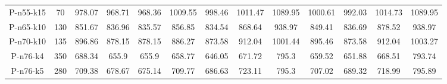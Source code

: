 \documentclass[11pt]{article} %
\begin{document}
\begin{enumerate}
\begin{landscape}
\begin{table}[p]
\begin{small}
\begin{tabular}{ccccccccccccc}
P-n55-k15&70&978.07&968.71&968.36&1009.55&998.46&1011.47&1089.95&1000.61&992.03&1014.73&1089.95\\
P-n65-k10&130&851.67&836.96&835.57&856.85&834.54&868.64&938.97&849.41&836.69&878.52&938.97\\
P-n70-k10&135&896.86&878.15&878.15&886.27&873.58&912.04&1001.44&895.46&873.58&912.04&1003.27\\
P-n76-k4&350&688.34&655.9&655.9&658.77&646.05&671.72&795.3&659.52&651.88&668.51&793.74\\
P-n76-k5&280&709.38&678.67&675.14&709.77&686.63&723.11&795.3&707.02&689.32&718.99&795.89\\
\bottomrule
\end{tabular}
\end{small}
\end{table}%


\end{landscape}
\end{enumerate}
\end{document}
